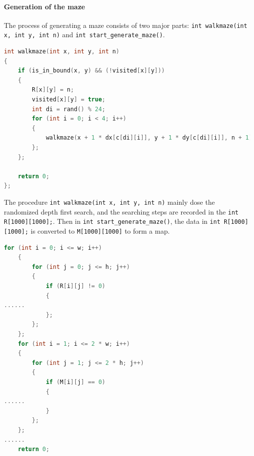 \documentclass[cn,black,12pt,normal]{elegantnote}
\begin{document}
\paragraph{Generation of the maze} The process of generating a maze consists of two major parts: \lstinline{int walkmaze(int x, int y, int n)} and \lstinline{int start_generate_maze()}.
\begin{lstlisting}[language = C++]
int walkmaze(int x, int y, int n)
{
	if (is_in_bound(x, y) && (!visited[x][y]))
	{
		R[x][y] = n;
		visited[x][y] = true;
		int di = rand() % 24;
		for (int i = 0; i < 4; i++)
		{
			walkmaze(x + 1 * dx[c[di][i]], y + 1 * dy[c[di][i]], n + 1);
		};
	};

	return 0;
};
\end{lstlisting}
The procedure \lstinline{int walkmaze(int x, int y, int n)} mainly dose the randomized depth first search, and the searching steps are recorded in the \lstinline{int R[1000][1000];}. Then in \lstinline{int start_generate_maze()}, the data in \lstinline{int R[1000][1000];} is converted to \lstinline{M[1000][1000]} to form a map.
\begin{lstlisting}[language = C++]
for (int i = 0; i <= w; i++)
	{
		for (int j = 0; j <= h; j++)
		{
			if (R[i][j] != 0)
			{
......
			};
		};
	};
	for (int i = 1; i <= 2 * w; i++)
	{
		for (int j = 1; j <= 2 * h; j++)
		{
			if (M[i][j] == 0)
			{
......
			}
		};
	};
......
	return 0;
\end{lstlisting}
\end{document}
